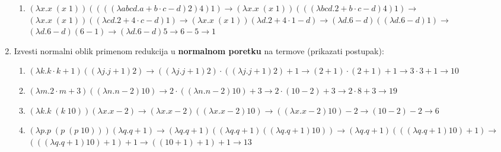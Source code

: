 \documentclass[a4paper]{article}
\begin{document}
\begin{enumerate}
\begin{enumerate}
\item $(\lambda x.x \; (x \; 1))((((\lambda abcd.a+b \cdot c-d)2)4)1) \rightarrow
(\lambda x.x \; (x \; 1))(((\lambda bcd.2+b \cdot c-d)4)1) \rightarrow$
\vspace*{3mm} \\
$(\lambda x.x \; (x \; 1))((\lambda cd.2+4 \cdot c-d)1) \rightarrow
(\lambda x.x \; (x \; 1))(\lambda d.2+4 \cdot 1-d) \rightarrow
(\lambda d.6-d)((\lambda d.6-d)1) \rightarrow $ \vspace*{3mm} \\
$(\lambda d.6-d)(6-1) \rightarrow (\lambda d.6-d)5 \rightarrow
6-5 \rightarrow 1$ \vspace*{4mm} \\

\end{enumerate}

\newpage
\item Izvesti normalni oblik primenom redukcija u \textbf{normalnom poretku} na termove (prikazati postupak):

\begin{enumerate}
\item $(\lambda k.k \cdot k+1)((\lambda j.j+1)2) \rightarrow 
((\lambda j.j+1)2) \cdot ((\lambda j.j+1)2) + 1 \rightarrow
(2+1) \cdot (2+1) + 1 \rightarrow 3 \cdot 3 + 1 \rightarrow 10$  \vspace*{4mm}\\

\item $(\lambda m.2 \cdot m+3)((\lambda n.n-2)10) \rightarrow
2 \cdot ((\lambda n.n-2)10) + 3 \rightarrow 
2 \cdot (10-2) + 3 \rightarrow 2 \cdot 8 + 3 \rightarrow 19$ \vspace*{4mm}\\

\item $(\lambda k.k \; (k \; 10))(\lambda x.x-2) \rightarrow
(\lambda x.x-2)((\lambda x.x-2)10) \rightarrow
((\lambda x.x-2)10) - 2 \rightarrow (10-2) -2 \rightarrow 6$ \vspace*{4mm} \\

\item $(\lambda p.p \; (p \;(p \; 10)))(\lambda q.q+1) \rightarrow
(\lambda q.q+1)((\lambda q.q+1)((\lambda q.q+1)10)) \rightarrow
(\lambda q.q+1)(((\lambda q.q+1)10) + 1) \rightarrow$  \vspace*{3mm}\\
$ (((\lambda q.q+1)10) + 1) + 1 \rightarrow ((10+1)+1)+1 \rightarrow 13$
\vspace*{4mm}\\


\end{enumerate}
\end{enumerate}
\end{document}
